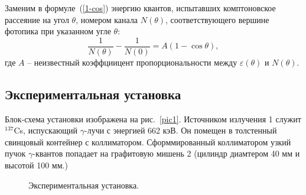 \documentclass[a4paper,12pt]{article} %
\begin{document}
	Заменим в формуле~(\ref{1-cos}) энергию квантов, испытавших комптоновское рассеяние на угол $\theta$, номером канала $N(\theta)$, соответствующего вершине фотопика при указанном угле $\theta$:
	\begin{equation}
		\label{kek}
		\tag{$\star \star \star$}
		\frac{1}{N(\theta)} - \frac{1}{N(0)} = A (1- \cos \theta),
	\end{equation}
	где $A$ -- неизвестный коэффциицент пропорциональности между $\varepsilon(\theta)$ и $N(\theta)$.
\newpage
\subsection{Экспериментальная установка}
	Блок-схема установки изображена на рис.~\ref{pic1}. Источником излучения 1 служит $^{137}$Cs, испускающий $\gamma$-лучи с энергией 662 кэВ. Он помещен в толстенный свинцовый контейнер с коллиматором. Сформмированный коллиматором узкий пучок $\gamma$-квантов попадает на графитовую мишень 2 (цилиндр диамтером 40 мм и высотой 100 мм.)
	
	
	\begin{figure}[h!]
		{\caption{Экспериментальная установка.}}
	\end{figure}
	
\end{document}
